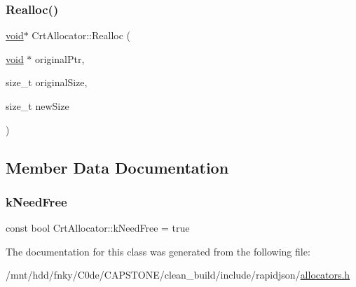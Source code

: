 \mbox{\label{classCrtAllocator_a646bb6f68afe773a62a22f7f14f83e97}} 
\subsubsection{\texorpdfstring{Realloc()}{Realloc()}}
{\footnotesize\ttfamily \hyperlink{imgui__impl__opengl3__loader_8h_ac668e7cffd9e2e9cfee428b9b2f34fa7}{void}$\ast$ Crt\+Allocator\+::\+Realloc (\begin{DoxyParamCaption}\item[{\hyperlink{imgui__impl__opengl3__loader_8h_ac668e7cffd9e2e9cfee428b9b2f34fa7}{void} $\ast$}]{original\+Ptr,  }\item[{size\+\_\+t}]{original\+Size,  }\item[{size\+\_\+t}]{new\+Size }\end{DoxyParamCaption})\hspace{0.3cm}{\ttfamily [inline]}}



\subsection{Member Data Documentation}
\mbox{\label{classCrtAllocator_ac7df8398c529290f0cd5950d9492f524}} 
\subsubsection{\texorpdfstring{k\+Need\+Free}{kNeedFree}}
{\footnotesize\ttfamily const bool Crt\+Allocator\+::k\+Need\+Free = true\hspace{0.3cm}{\ttfamily [static]}}



The documentation for this class was generated from the following file\+:\begin{DoxyCompactItemize}
\item 
/mnt/hdd/fnky/\+C0de/\+C\+A\+P\+S\+T\+O\+N\+E/clean\+\_\+build/include/rapidjson/\hyperlink{allocators_8h}{allocators.\+h}\end{DoxyCompactItemize}
